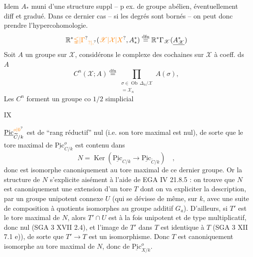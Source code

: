 Idem  $A_*$ muni d'une structure suppl -- p ex. de groupe abélien, éventuellement diff et gradué. Dans ce dernier cas -- si les degrés sont bornés  -- on peut donc prendre l'hypercohomologie.
\[
 \mathbb{R}^*\unsure{\mathbb{\Gamma}|\Gamma}_{\unsure{?|,}}(\unsure{\mathscr{X}|\mathcal{X}|X},A_*^*)\overset{\mathrm{dfn}}{=}
 \mathbb{R}^*\Gamma_{\mathscr{X}}(\underline{A_{\mathscr{X}}^*})
\]
Soit $A$ un groupe sur $\mathscr{X}$, considérons le complexe des cochaines sur $\mathscr{X}$ à coeff. ds $A$
\[
 C^n(\mathscr{X};A)\overset{\mathrm{dfn}}{=}
 \prod_{\substack{\sigma\in\operatorname{Ob}\,\Delta_n/\mathscr{X}\\=\mathscr{X}_n}}A(\sigma),
\]
Les $C^n$ forment un groupe co $1/2$ simplicial

\hfill IX

$\underline{\mathrm{Pic}}^{\unsure{o|0}}_{\widetilde C/k}$ est de ``rang réductif'' nul (i.e. son tore maximal est nul), de sorte que le tore maximal de $\underline{\mathrm{Pic}}^o_{C/k}$ est contenu dans
\[
 N=\operatorname{Ker}(\underline{\mathrm{Pic}}_{C/k}\longrightarrow\underline{\mathrm{Pic}}_{\widetilde C/k})\quad ,
\]
donc est isomorphe canoniquement au tore maximal de ce dernier groupe.
Or la structure de $N$ s'explicite aisément à l'aide de EGA IV 21.8.5 : on trouve que $N$ est canoniquement une extension d'un tore $T$ dont on va expliciter la description, par un groupe unipotent connexe $U$ (qui se dévisse de même, sur $k$, avec une suite de composition à quotients isomorphes au groupe additif $G_a$). D'ailleurs, si $T'$ est le tore maximal de $N$, alors $T'\cap U$ est à la fois unipotent et de type multiplicatif, donc nul (SGA 3 XVII 2.4), et l'image de $T'$ dans $T$ est identique à $T$ (SGA 3 XII 7.1 e)), de sorte que $T'\longrightarrow T$ est un isomorphisme. Donc $T$ est canoniquement isomorphe au tore maximal de $N$, donc de $\underline{\mathrm{Pic}}^o_{X/k}$.

